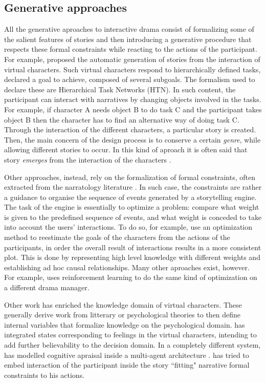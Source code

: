 \documentclass[
		twoside,openright,titlepage,numbers=noenddot,manychapters,
		headinclude,%
                footinclude=false,cleardoublepage=empty,
                BCOR=5mm,
		fontsize=11pt, %
                 enabledeprecatedfontcommands]{scrreprt}
\begin{document}
\subsection{Generative approaches}
All the generative aproaches to interactive drama consist of formalizing some of the salient features of stories and then introducing a generative procedure that respects these formal constraints while reacting to the actions of the participant. For example, \cite{cavazza2002character} proposed the automatic generation of stories from the interaction of virtual characters. Such virtual characters respond to hierarchically defined tasks, declared a goal to achieve, composed of several subgoals. The formalism used to declare these are Hierarchical Task Networks (HTN). In such content, the participant can interact with narratives by changing objects involved in the tasks. For example, if character A needs object B to do task C and the participant takes object B then the character has to find an alternative way of doing task C. Through the interaction of the different characters, a particular story is created. Then, the main concern of the design process is to conserve a certain \emph{genre}, while allowing different stories to occur. In this kind of aproach it is often said that story \emph{emerges} from the interaction of the characters \cite[]{chang2008simulation}.

Other approaches, instead, rely on the formalization of formal constraints, often extracted from the narratology literature \cite[]{cavazza2006nis}. In such case, the constraints are rather a guidance to organise the sequence of events generated by a storytelling engine. The task of the engine is essentially to optimize a problem: compare what weight is given to the predefined sequence of events, and what weight is conceded to take into account the users' interactions. To do so, for example,  \cite{cai2006fuzzy} use an optimization method to reestimate the goals of the characters from the actions of the participants, in order the overall result of interactions results in a more consistent plot. This is done by representing high level knowledge with different weights and establishing ad hoc causal relationships. Many other aproaches exist, however. For example, \cite{nelson2006reinforcement} uses reinforcement learning to do the same kind of optimization on a different drama manager.

Other work has enriched the knowledge domain of virtual characters. These generally derive work from litterary or psychological theories to then define internal variables that formalize knowledge on the psychological domain. \cite{pizzi2007interactive} has integrated states corresponding to feelings in the virtual characters, intending to add further believability to the decision domain. In a completely different system, \cite{si2010modeling} has modelled cognitive apraisal inside a multi-agent architecture \cite[]{si2005thespian}. \cite{murray2005dmy} has tried to embed interaction of the participant inside the story ``fitting"  narrative formal constraints to his actions.
\end{document}
